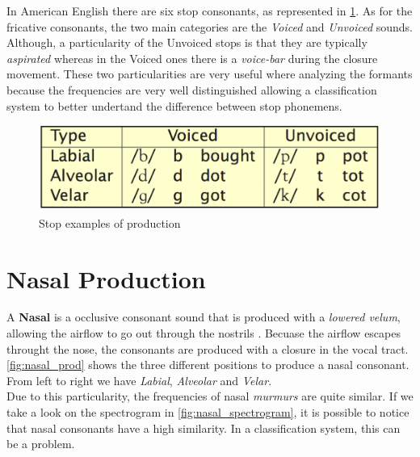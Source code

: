 \noindent In American English there are six stop consonants, as represented in \ref{fig:stop_ex}. As for the fricative consonants, the two main categories are the \textit{Voiced} and \textit{Unvoiced} sounds. Although, a particularity of the Unvoiced stops is that they are typically \textit{aspirated} whereas in the Voiced ones there is a \textit{voice-bar} during the closure movement. These two particularities are very useful where analyzing the formants because the frequencies are very well distinguished allowing a classification system to better undertand the difference between stop phonemens.

\begin{figure}[!ht]
    \centering
    \includegraphics[scale=0.5]{Figures/stop_examples.png}
    \caption{Stop examples of production \cite{mit_phonetics}}
    \label{fig:stop_ex}
\end{figure}


\section{Nasal Production}
\label{sec:Nasal Production}
A \textbf{Nasal} is a occlusive consonant sound that is produced with a \textit{lowered velum}, allowing the airflow to go out through the nostrils \cite{nasal_consonants_wiki}. Becuase the airflow escapes throught the nose, the consonants are produced with a closure in the vocal tract. \ref{fig:nasal_prod} shows the three different positions to produce a nasal consonant. From left to right we have \textit{Labial}, \textit{Alveolar} and \textit{Velar}. \\
\noindent Due to this particularity, the frequencies of nasal \textit{murmurs} are quite similar. If we take a look on the spectrogram in \ref{fig:nasal_spectrogram}, it is possible to notice that nasal consonants have a high similarity. In a classification system, this can be a problem.

